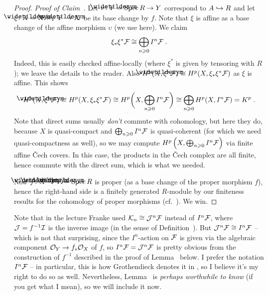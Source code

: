 \documentclass[a4paper,parskip=half,numbers=enddot, DIV=12]{scrreprt}
\renewcommand{\geq}{\geqslant}
\begin{document}
\begin{proof}
	\emph{Proof of Claim~.} Let $\upsilon\colon\snake{Y}=\Spec R\morphism Y$ correspond to $A\monomorphism R$ and let $\xi\colon \snake{X}=X\times_Y\snake{Y}\morphism X$ be its base change by $f$. Note that $\xi$ is affine as a base change of the affine morphism $\upsilon$ (we use \cite[Corollary~2.5.1]{alggeo1} here). We claim
	\begin{align*}
		\xi_*\xi^*\Ff\cong\bigoplus_{n\geq 0}I^n\Ff\;.
	\end{align*}
	Indeed, this is easily checked affine-locally (where $\xi^*$ is given by tensoring with $R$); we leave the details to the reader. Also $H^p(\snake{X},\xi^*\Ff)\cong H^p(X,\xi_*\xi^*\Ff)$ as $\xi$ is affine. This shows
	\begin{align*}
		H^p(\snake{X},\xi^*\Ff)\cong H^p(X,\xi_*\xi^*\Ff)\cong H^p\bigg(X,\bigoplus_{n\geq 0}I^n\Ff\bigg)\cong \bigoplus_{n\geq 0}H^p(X,I^n\Ff)=K^p\;.
	\end{align*}
	Note that direct sums usually \emph{don't} commute with cohomology, but here they do, because $X$ is quasi-compact and $\bigoplus_{n\geq 0}I^n\Ff$ is quasi-coherent (for which we need quasi-compactness as well), so we may compute $H^p\left(X,\bigoplus_{n\geq 0}I^n\Ff\right)$ via finite affine \v Cech covers. In this case, the products in the \v Cech complex are all finite, hence commute with the direct sum, which is what we needed.
	
	Now $\snake{f}\colon \snake{X}\morphism\snake{Y}=\Spec R$ is proper (as a base change of the proper morphism $f$), hence the right-hand side is a finitely generated $R$-module by our finiteness results for the cohomology of proper morphisms (cf.\ \cite[Theorem~5]{alggeo2}). We win.
\end{proof}
\begin{rem}
	Note that in the lecture Franke used $\mathcal{K}_n\cong \mathcal{J}^n\mathcal{F}$ instead of $I^n\mathcal{F}$, where $\mathcal{J}=f^{-1}\mathcal{I}$ is the inverse image (in the sense of Definition~). But $\mathcal{J}^n\mathcal{F}\cong I^n\mathcal{F}$ -- which is not that surprising, since the $I^n$-action on $\mathcal{F}$ is given via the algebraic component $\Oo_Y\morphism f_*\Oo_X$ of $f$, so $I^n\mathcal{F}=\mathcal{J}^n\mathcal{F}$ is pretty obvious from the construction of $f^{-1}$ described in the proof of Lemma~ below. I prefer the notation $I^n\mathcal{F}$ -- in particular, this is how Grothendieck denotes it in \cite[(4.1.7)]{egaIII}, so I believe it's my right to do so as well. Nevertheless, Lemma~ is \emph{perhaps worthwhile to know} (if you get what I mean), so we will include it now.
\end{rem}
\end{document}
